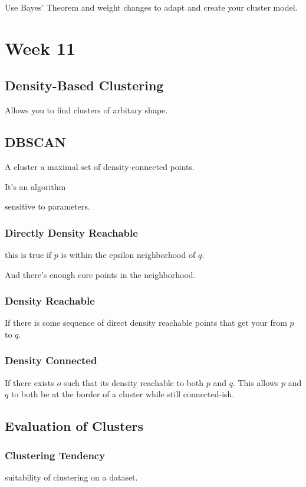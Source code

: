 \documentclass[fleqn]{report}
\begin{document}
Use Bayes' Theorem and weight changes to adapt and 
create your cluster model.

\chapter{Week 11}

\section{Density-Based Clustering}
Allows you to find clusters of arbitary shape. 

\section{DBSCAN}
A cluster a maximal set of density-connected points.

It's an algorithm 

sensitive to parameters. 

\subsection{Directly Density Reachable}
this is true if $p$ is within the 
epsilon neighborhood of $q$.

And there's enough core points in the neighborhood.

\subsection{Density Reachable}
If there is some sequence of direct density reachable points 
that get your from $p$ to $q$.

\subsection{Density Connected}
If there exists $o$ such that its density reachable to 
both $p$ and $q$. This allows $p$ and $q$ to both 
be at the border of a cluster while still connected-ish.

\section{Evaluation of Clusters}

\subsection{Clustering Tendency}
suitability of clustering on a dataset. 
\end{document}
